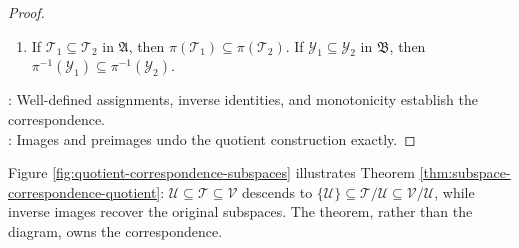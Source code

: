 \begin{theorem}
\begin{proof}
\begin{enumerate}[label=(\roman*)]
Then $\mathbf{v}-\mathbf{t}\in\mathcal{U}\subseteq\mathcal{T}$ by Proposition \ref{prop:parallel-affine-subsets-equal-or-disjoint}, so $\mathbf{v}\in\mathcal{T}$. Thus $\Psi(\Phi(\mathcal{T}))=\mathcal{T}$. Let $\mathcal{Y}\in\mathfrak{B}$.\\
If $\mathbf{v}\in\pi^{-1}(\mathcal{Y})$, then $\pi(\mathbf{v})\in\mathcal{Y}$, so $\pi(\pi^{-1}(\mathcal{Y}))\subseteq\mathcal{Y}$. If $\mathbf{y}\in\mathcal{Y}$, choose $\mathbf{v}\in\mathcal{V}$ with $\pi(\mathbf{v})=\mathbf{y}$ by Proposition \ref{prop:quotient-map-properties}(ii).\\
Then $\mathbf{v}\in\pi^{-1}(\mathcal{Y})$, so $\mathbf{y}\in\pi(\pi^{-1}(\mathcal{Y}))$. Therefore $\Phi(\Psi(\mathcal{Y}))=\mathcal{Y}$.
\item If $\mathcal{T}_1\subseteq\mathcal{T}_2$ in $\mathfrak{A}$, then $\pi(\mathcal{T}_1)\subseteq\pi(\mathcal{T}_2)$. If $\mathcal{Y}_1\subseteq\mathcal{Y}_2$ in $\mathfrak{B}$, then $\pi^{-1}(\mathcal{Y}_1)\subseteq\pi^{-1}(\mathcal{Y}_2)$.
\end{enumerate}
: Well-defined assignments, inverse identities, and monotonicity establish the correspondence.\\
: Images and preimages undo the quotient construction exactly.
\end{proof}
\end{theorem}

\begin{illustrationfigure}[H]
  \centering
  
  \caption{Intermediate subspaces above $\mathcal{U}$ correspond to subspaces of the quotient; horizontal arrows denote inclusions and vertical arrows denote quotient images.}
  \label{fig:quotient-correspondence-subspaces}
\end{illustrationfigure}

Figure \ref{fig:quotient-correspondence-subspaces} illustrates Theorem \ref{thm:subspace-correspondence-quotient}: $\mathcal{U}\subseteq\mathcal{T}\subseteq\mathcal{V}$ descends to $\{\mathcal{U}\}\subseteq\mathcal{T}/\mathcal{U}\subseteq\mathcal{V}/\mathcal{U}$, while inverse images recover the original subspaces. The theorem, rather than the diagram, owns the correspondence.

